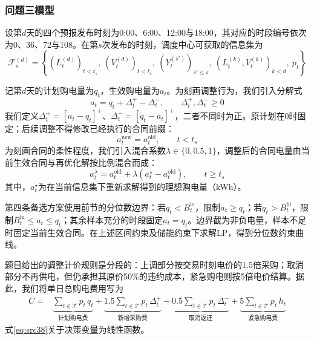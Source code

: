 \subsubsection{问题三模型}

设第$d$天的四个预报发布时刻为0:00、6:00、12:00与18:00，其对应的时段编号依次为0、36、72与108。在第$s$次发布的时刻，调度中心可获取的信息集为
\begin{equation}\label{eq:src34}
    \mathcal{F}_{s}^{(d)}=\left\{\left(L_{t}^{(d)}\right)_{t<t_{s}},\ \left(V_{t}^{(d)}\right)_{t<t_{s}},\ \left(Y_{t}^{(s')}\right)_{s'\le s},\ \left(L_{t}^{(k)},V_{t}^{(k)}\right)_{k<d},\ p_{t}\right\}
\end{equation}

记第$d$天的计划购电量为$q_t$，生效购电量为$a_t$。为刻画调整行为，我们引入分解式
\begin{equation}\label{eq:src35}
    a_{t}=q_{t}+\Delta_{t}^{+}-\Delta_{t}^{-},\qquad \Delta_{t}^{+},\Delta_{t}^{-}\ge 0
\end{equation}
我们定义$\Delta_t^+=[a_t-q_t]^+$、$\Delta_t^-=[q_t-a_t]^+$，二者不同时为正。原计划在0时固定；后续调整不得修改已经执行的合同前缀：
\begin{equation}\label{eq:src36}
    a_t^{\mathrm{new}}=a_t^{\mathrm{old}},\qquad t<t_s
\end{equation}
为刻画合同的柔性程度，我们引入混合系数$\lambda\in\{0,0.5,1\}$，调整后的合同电量由当前生效合同与再优化解按比例混合而成：
\begin{equation}\label{eq:src37}
    a_{t}^{\lambda}=a_t^{\mathrm{old}}+\lambda\left(a_{t}^{\star}-a_t^{\mathrm{old}}\right),\qquad t\ge t_{s}
\end{equation}
其中，$a_t^{\star}$为在当前信息集下重新求解得到的理想购电量（kWh）。

第四条备选方案使用前节的分位数边界：若$q_t<B_t^{\mathrm{lo}}$，限制$a_t\ge q_t$；若$q_t>B_t^{\mathrm{hi}}$，限制$B_t^{\mathrm{hi}}\le a_t\le q_t$；其余样本充分的时段固定$a_t=q_t$。边界截为非负电量，样本不足时固定当前生效合同。在上述区间约束及储能约束下求解LP，得到分位数约束曲线。



题目给出的调整计价规则是分段的：上调部分按交易时刻电价的1.5倍采购；取消部分不再供电，但仍承担其原价50\%的违约成本，紧急购电则按5倍电价结算。据此，我们将单日总购电费用写为
\begin{equation}\label{eq:src38}
    \begin{aligned}
    C={}&\underbrace{\sum_{t\in\mathcal{T}}p_{t}\,q_{t}}_{\text{计划购电费}}
    +\underbrace{1.5\sum_{t\in\mathcal{T}}p_{t}\,\Delta_{t}^{+}}_{\text{新增采购费}}
    -\underbrace{0.5\sum_{t\in\mathcal{T}}p_{t}\,\Delta_{t}^{-}}_{\text{取消返还}}
    +\underbrace{5\sum_{t\in\mathcal{T}}p_{t}\,h_{t}}_{\text{紧急购电费}}
    \end{aligned}
\end{equation}
式\eqref{eq:src38}关于决策变量为线性函数。

